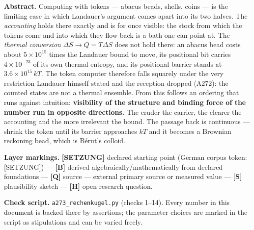 
\providecommand{\qedsq}{\raisebox{0.03em}{\framebox[0.62em]{\rule{0pt}{0.42em}}}}
\begingroup\small\noindent
\textbf{Abstract.} Computing with tokens --- abacus beads, shells, coins --- is
the limiting case in which Landauer's argument comes apart into its two halves.
The \emph{accounting} holds there exactly and is for once visible: the stock from
which the tokens come and into which they flow back is a bath one can point at.
The \emph{thermal conversion} $\Delta S \to Q = T\Delta S$ does not hold there: an
abacus bead costs about $5\times10^{15}$ times the Landauer bound to move, its
positional bit carries $4\times10^{-23}$ of its own thermal entropy, and its
positional barrier stands at $3.6\times10^{15}\,kT$. The token computer therefore
falls squarely under the very restriction Landauer himself stated and the
reception dropped (A272): the counted states are not a thermal ensemble. From
this follows an ordering that runs against intuition: \textbf{visibility of the
structure and binding force of the number run in opposite directions.} The cruder
the carrier, the clearer the accounting and the more irrelevant the bound. The
passage back is continuous --- shrink the token until its barrier approaches
$kT$ and it becomes a Brownian reckoning bead, which is Bérut's colloid.
\par\endgroup

\bigskip

\begingroup\small\noindent
\textbf{Layer markings.} \textbf{[SETZUNG]} declared starting point (German corpus token:
[SETZUNG]) --- \textbf{[B]} derived algebraically/mathematically from declared foundations
--- \textbf{[Q]} source --- external primary source or measured value --- \textbf{[S]}
plausibility sketch --- \textbf{[H]} open research question.

\par\endgroup

\bigskip

\begingroup\small\noindent
\textbf{Check script.} \texttt{a273\_rechenkugel.py} (checks 1--14). Every number
in this document is backed there by assertions; the parameter choices are marked
in the script as stipulations and can be varied freely.
\par\endgroup

\bigskip

